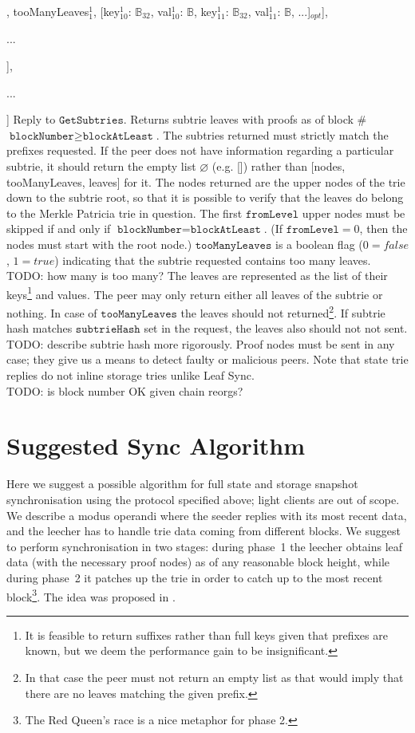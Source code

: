 \documentclass{amsart}
\begin{document}
\qquad [[node$^1_{10}$: $\mathbb{B}$, node$^1_{11}$: $\mathbb{B}$, ...], tooManyLeaves$^1_1$, [key$^1_{10}$: $\mathbb{B}_{32}$, val$^1_{10}$: $\mathbb{B}$, key$^1_{11}$: $\mathbb{B}_{32}$, val$^1_{11}$: $\mathbb{B}$, ...]$_{opt}$],

\qquad ...

\quad ],

\quad ...

] Reply to $\texttt{GetSubtries}$.
Returns subtrie leaves with proofs as of block \#$\texttt{blockNumber} \geq \texttt{blockAtLeast}$.
The subtries returned must strictly match the prefixes requested.
If the peer does not have information regarding a particular subtrie, it should return the empty list $\varnothing$ (e.g. []) rather than [nodes, tooManyLeaves, leaves] for it.
The nodes returned are the upper nodes of the trie down to the subtrie root, so that it is possible to verify that the leaves do belong to the Merkle Patricia trie in question.
The first $\texttt{fromLevel}$ upper nodes must be skipped if and only if $\texttt{blockNumber} = \texttt{blockAtLeast}$.
(If $\texttt{fromLevel} = 0$, then the nodes must start with the root node.)
$\texttt{tooManyLeaves}$ is a boolean flag ($0=false$, $1=true$) indicating that the subtrie requested contains too many leaves.
TODO: how many is too many?
The leaves are represented as the list of their keys\footnote{It
is feasible to return suffixes rather than full keys given that prefixes are known, but we deem the performance gain to be insignificant.}
and values.
The peer may only return either all leaves of the subtrie or nothing.
In case of $\texttt{tooManyLeaves}$ the leaves should not returned\footnote{In
that case the peer must not return an empty list as that would imply that there are no leaves matching the given prefix.}.
If subtrie hash matches $\texttt{subtrieHash}$ set in the request, the leaves also should not not sent.
TODO: describe subtrie hash more rigorously.
Proof nodes must be sent in any case;
they give us a means to detect faulty or malicious peers.
Note that state trie replies do not inline storage tries unlike Leaf Sync.\\

TODO: is block number OK given chain reorgs?

\section{Suggested Sync Algorithm}

Here we suggest a possible algorithm for full state and storage snapshot synchronisation using the protocol specified above;
light clients are out of scope.
We describe a modus operandi where the seeder replies with its most recent data,
and the leecher has to handle trie data coming from different blocks.
We suggest to perform synchronisation in two stages:
during phase~1 the leecher obtains leaf data (with the necessary proof nodes) as of any reasonable block height,
while during phase~2 it patches up the trie in order to catch up to the most recent block\footnote{The
Red Queen's race is a nice metaphor for phase 2.}.
The idea was proposed in \cite{leaf_sync}.
\end{document}
